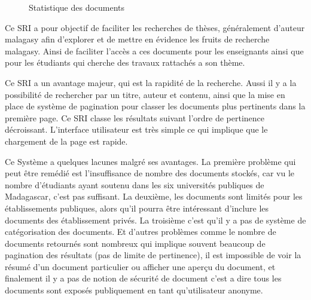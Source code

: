 \begin{figure}[htbp]
	\begin{center}
	\end{center}
	\caption{Statistique des documents \citep{these-malgache-en-ligne}}
	\label{fig:statistic-tme}
\end{figure}

Ce SRI a pour objectif de faciliter les recherches de thèses, généralement d'auteur malagasy afin d'explorer et de mettre en évidence les fruits de recherche malagasy. Ainsi de faciliter l'accès a ces documents pour les enseignants ainsi que pour les étudiants qui cherche des travaux rattachés a son thème.

Ce SRI a un avantage majeur, qui est la rapidité de la recherche. Aussi il y a la possibilité de rechercher par un titre, auteur et contenu, ainsi que la mise en place de système de pagination pour classer les documents plus pertinents dans la première page. Ce SRI classe les résultats suivant l'ordre de pertinence décroissant. L'interface utilisateur est très simple ce qui implique que le chargement de la page est rapide.

Ce Système a quelques lacunes malgré ses avantages. La première problème qui peut être remédié est l'insuffisance de nombre des documents stockés, car vu le nombre d'étudiants ayant soutenu dans les six universités publiques de Madagascar, c'est pas suffisant. La deuxième, les documents sont limités pour les établissements publiques, alors qu'il pourra être intéressant d'inclure les documents des établissement privés. La troisième c'est qu'il y a pas de système de catégorisation des documents. Et d'autres problèmes comme le nombre de documents retournés sont nombreux qui implique souvent beaucoup de pagination des résultats (pas de limite de pertinence), il est impossible de voir la résumé d'un document particulier ou afficher une aperçu du document, et finalement il y a pas de notion de sécurité de document c'est a dire tous les documents sont exposés publiquement en tant qu'utilisateur anonyme.

